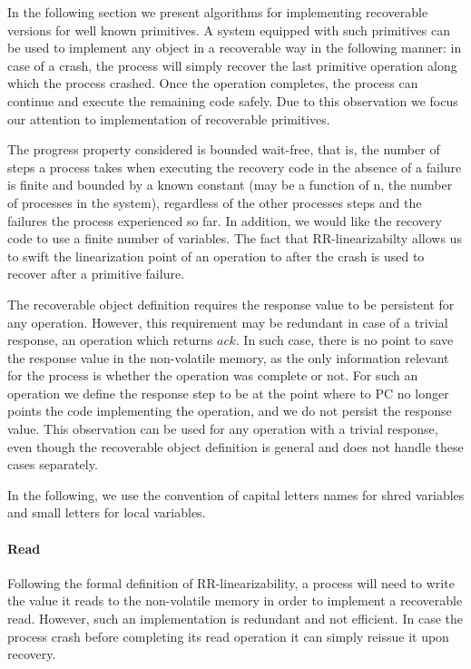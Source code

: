 In the following section we present algorithms for implementing recoverable versions for well known primitives. A system equipped with such primitives can be used to implement any object in a recoverable way in the following manner: in case of a crash, the process will simply recover the last primitive operation along which the process crashed. Once the operation completes, the process can continue and execute the remaining code safely. Due to this observation we focus our attention to implementation of recoverable primitives.

The progress property considered is bounded wait-free, that is, the number of steps a process takes when executing the recovery code in the absence of a failure is finite and bounded by a known constant (may be a function of n, the number of processes in the system), regardless of the other processes steps and the failures the process experienced so far. In addition, we would like the recovery code to use a finite number of variables.
The fact that RR-linearizabilty allows us to swift the linearization point of an operation to after the crash is used to recover after a primitive failure.

The recoverable object definition requires the response value to be persistent for any operation. However, this requirement may be redundant in case of a trivial response, an operation which returns $ack$. In such case, there is no point to save the response value in the non-volatile memory, as the only information relevant for the process is whether the operation was complete or not. For such an operation we define the response step to be at the point where to PC no longer points the code implementing the operation, and we do not persist the response value. This observation can be used for any operation with a trivial response, even though the recoverable object definition is general and does not handle these cases separately.

In the following, we use the convention of capital letters names for shred variables and small letters for local variables.

\paragraph*{Read}

Following the formal definition of RR-linearizability, a process will need to write the value it reads to the non-volatile memory in order to implement a recoverable read. However, such an implementation is redundant and not efficient. In case the process crash before completing its read operation it can simply reissue it upon recovery.

